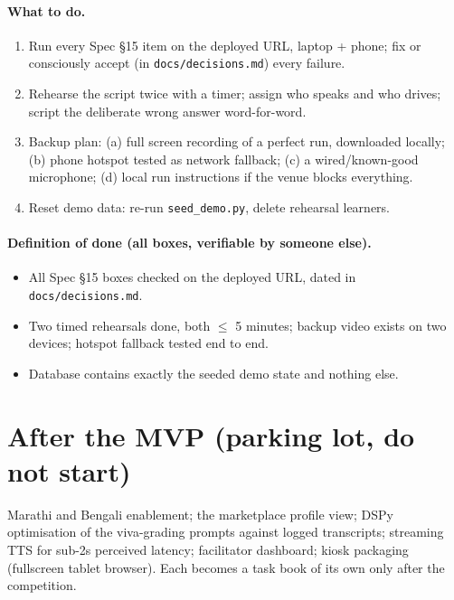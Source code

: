 \documentclass[11pt]{article}
\newcommand{\code}[1]{\texttt{#1}}
\newcommand{\dod}{\paragraph{Definition of done (all boxes, verifiable by someone else).}}
\begin{document}
\paragraph{What to do.}
\begin{enumerate}
  \item Run every Spec \S15 item on the deployed URL, laptop + phone; fix or consciously accept (in \code{docs/decisions.md}) every failure.
  \item Rehearse the script twice with a timer; assign who speaks and who drives; script the deliberate wrong answer word-for-word.
  \item Backup plan: (a) full screen recording of a perfect run, downloaded locally; (b) phone hotspot tested as network fallback; (c) a wired/known-good microphone; (d) local run instructions if the venue blocks everything.
  \item Reset demo data: re-run \code{seed\_demo.py}, delete rehearsal learners.
\end{enumerate}
\dod
\begin{itemize}
  \item All Spec \S15 boxes checked on the deployed URL, dated in \code{docs/decisions.md}.
  \item Two timed rehearsals done, both $\leq$ 5 minutes; backup video exists on two devices; hotspot fallback tested end to end.
  \item Database contains exactly the seeded demo state and nothing else.
\end{itemize}

\section{After the MVP (parking lot, do not start)}

Marathi and Bengali enablement; the marketplace profile view; DSPy optimisation of the viva-grading prompts against logged transcripts; streaming TTS for sub-2s perceived latency; facilitator dashboard; kiosk packaging (fullscreen tablet browser). Each becomes a task book of its own only after the competition.
\end{document}
